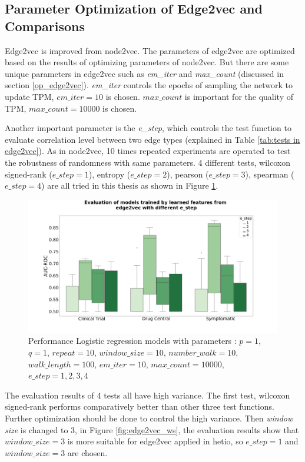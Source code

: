 \subsection{Parameter Optimization of Edge2vec and Comparisons}

Edge2vec is improved from node2vec. The parameters of edge2vec are optimized based on the results of optimizing parameters of node2vec. But there are some unique parameters in edge2vec such as \textit{em\_iter} and \textit{max\_count} (discussed in section \ref{op_edge2vec}). \textit{em\_iter} controls the epochs of sampling the network to update \ac{TPM}, $em\_iter = 10$ is chosen. $max\_count$ is important for the quality of TPM, $max\_count = 10000$ is chosen. 

Another important parameter is the \textit{e\_step}, which controls the test function to evaluate correlation level between two edge types (explained in Table \ref{tab:tests in edge2vec}). As in node2vec, 10 times repeated experiments are operated to test the robustness of randomness with same parameters. 4 different tests, wilcoxon signed-rank ($e\_step =1$), entropy ($e\_step = 2$), pearson ($e\_step = 3$), spearman ($e\_step = 4$) are all tried in this thesis as shown in Figure \ref{fig:estep}. 

\begin{figure}[!h]
    \centering
    \includegraphics[scale=0.2]
    {figures/e_step.png}
    \captionsetup{justification=centering}
    \caption[Evaluation of different e\_step in edge2vec]{\label{fig:estep}Performance Logistic regression models with parameters : $p = 1$, $q = 1$, $repeat = 10$, $window\_size = 10$, $number\_walk = 10$, $walk\_length =  100$, $em\_iter = 10$, $max\_count = 10000$, $e\_step = 1, 2, 3, 4$
}
\end{figure}

The evaluation results of 4 tests all have high variance. The first test, wilcoxon signed-rank performs comparatively better than other three test functions. Further optimization should be done to control the high variance. Then \textit{window size} is changed to 3, in Figure \ref{fig:edge2vec_ws}, the evaluation results show that $window\_size = 3$ is more suitable for edge2vec applied in hetio, so $e\_step = 1$ and $window\_size = 3$ are chosen.

